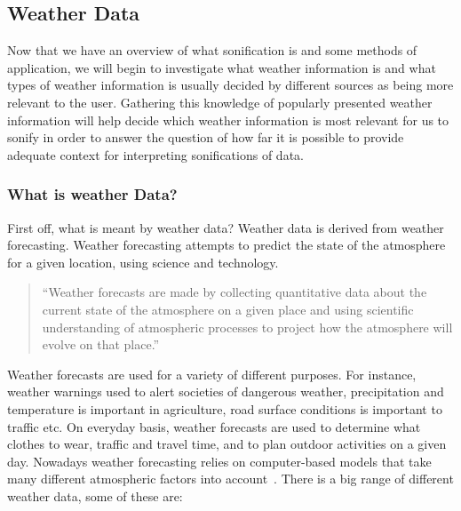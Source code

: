 

\subsection{Weather Data} %
\label{sub:weather_data}

Now that we have an overview of what sonification is and some methods of application, we will begin to investigate what weather information is and what types of weather information is usually decided by different sources as being more relevant to the user. 
Gathering this knowledge of popularly presented weather information will help decide which weather information is most relevant for us to sonify in order to answer the question of how far it is possible to provide adequate context for interpreting sonifications of data.


\subsubsection{What is weather Data?} %
\label{ssub:what_is_weather_data_}
First off, what is meant by weather data? Weather data is derived from weather forecasting. 
Weather forecasting attempts to predict the state of the atmosphere for a given location, using science and technology.

\begin{quote}
``Weather forecasts are made by collecting quantitative data about the current state of the atmosphere on a given place and using scientific understanding of atmospheric processes to project how the atmosphere will evolve on that place.'' \cite*{Wiki2014-1}
\end{quote}

Weather forecasts are used for a variety of different purposes. 
For instance, weather warnings used to alert societies of dangerous weather, precipitation and temperature is important in agriculture, road surface conditions is important to traffic etc. 
On everyday basis, weather forecasts are used to determine what clothes to wear, traffic and travel time, and to plan outdoor activities on a given day.
Nowadays weather forecasting relies on computer-based models that take many different atmospheric factors into account~\cite{Shuman1978}.
There is a big range of different weather data, some of these are:

